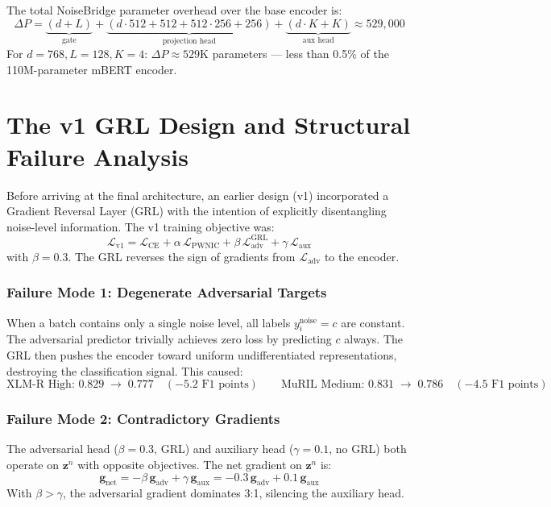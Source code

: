\documentclass[12pt,a4paper]{report}
\newcommand{\PWNIC}{\mathcal{L}_{\mathrm{PWNIC}}}
\newcommand{\LCE}{\mathcal{L}_{\mathrm{CE}}}
\newcommand{\Laux}{\mathcal{L}_{\mathrm{aux}}}
\begin{document}
The total NoiseBridge parameter overhead over the base encoder is:
\begin{equation}
  \Delta P = \underbrace{(d + L)}_{\text{gate}} + \underbrace{(d \cdot 512 + 512 + 512 \cdot 256 + 256)}_{\text{projection head}} + \underbrace{(d \cdot K + K)}_{\text{aux head}} \approx 529{,}000
  \label{eq:param_overhead}
\end{equation}
For $d = 768, L = 128, K = 4$: $\Delta P \approx 529$K parameters --- less than 0.5\% of the 110M-parameter mBERT encoder.

\section{The v1 GRL Design and Structural Failure Analysis}
\label{sec:grl}

Before arriving at the final architecture, an earlier design (v1) incorporated a Gradient Reversal Layer (GRL) \cite{ganin2016domain} with the intention of explicitly disentangling noise-level information. The v1 training objective was:
\begin{equation}
  \mathcal{L}_{\text{v1}} = \LCE + \alpha\,\PWNIC + \beta\,\mathcal{L}_{\text{adv}}^{\text{GRL}} + \gamma\,\Laux
  \label{eq:v1_loss}
\end{equation}
with $\beta = 0.3$. The GRL reverses the sign of gradients from $\mathcal{L}_{\text{adv}}$ to the encoder.

\subsubsection{Failure Mode 1: Degenerate Adversarial Targets}
When a batch contains only a single noise level, all labels $y_i^{\text{noise}} = c$ are constant. The adversarial predictor trivially achieves zero loss by predicting $c$ always. The GRL then pushes the encoder toward uniform undifferentiated representations, destroying the classification signal. This caused:
\[
  \text{XLM-R High: } 0.829 \;\longrightarrow\; 0.777 \quad (-5.2\text{ F1 points})
  \qquad
  \text{MuRIL Medium: } 0.831 \;\longrightarrow\; 0.786 \quad (-4.5\text{ F1 points})
\]

\subsubsection{Failure Mode 2: Contradictory Gradients}
The adversarial head ($\beta = 0.3$, GRL) and auxiliary head ($\gamma = 0.1$, no GRL) both operate on $\mathbf{z}^n$ with opposite objectives. The net gradient on $\mathbf{z}^n$ is:
\begin{equation}
  \mathbf{g}_{\text{net}} = -\beta\,\mathbf{g}_{\text{adv}} + \gamma\,\mathbf{g}_{\text{aux}} = -0.3\,\mathbf{g}_{\text{adv}} + 0.1\,\mathbf{g}_{\text{aux}}
  \label{eq:contradictory_grad}
\end{equation}
With $\beta > \gamma$, the adversarial gradient dominates 3:1, silencing the auxiliary head.
\end{document}
